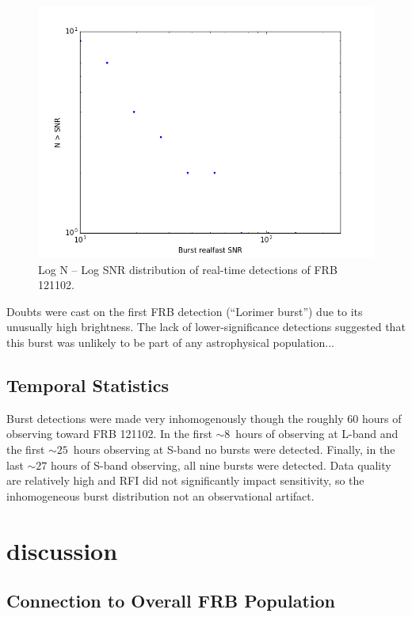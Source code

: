 \documentclass{emulateapj}
\begin{document}
\begin{figure}[htb]
\begin{center}
\includegraphics[width=0.9\columnwidth]{logns}
\caption{Log N -- Log SNR distribution of real-time detections of FRB 121102.
\label{fig:logns}}
\end{center}
\end{figure}

Doubts were cast on the first FRB detection (``Lorimer burst'') due to its unusually high brightness. The lack of lower-significance detections suggested that this burst was unlikely to be part of any astrophysical population...

\subsection{Temporal Statistics}

Burst detections were made very inhomogenously though the roughly 60 hours of observing toward FRB 121102. In the first $\sim8$\ hours of observing at L-band and the first $\sim25$\ hours observing at S-band no bursts were detected. Finally, in the last $\sim27$ hours of S-band observing, all nine bursts were detected. Data quality are relatively high and RFI did not significantly impact sensitivity, so the inhomogeneous burst distribution not an observational artifact.

\section{discussion}

\subsection{Connection to Overall FRB Population}
\end{document}
